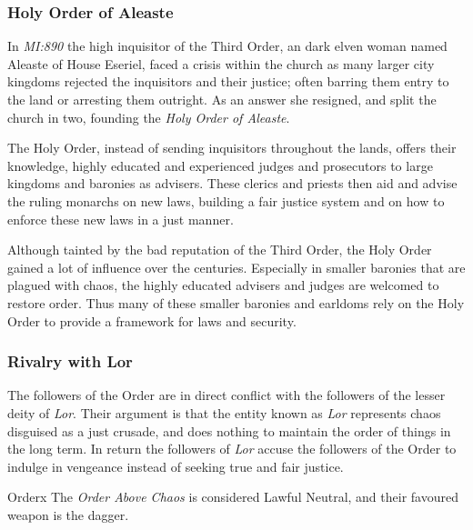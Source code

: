 \subsubsection*{Holy Order of Aleaste}

In \emph{MI:890} the high inquisitor of the Third Order, an dark elven woman
named Aleaste of House Eseriel, faced a crisis within the church as many
larger city kingdoms rejected the inquisitors and their justice; often barring
them entry to the land or arresting them outright. As an answer she resigned,
and split the church in two, founding the \emph{Holy Order of Aleaste}.

The Holy Order, instead of sending inquisitors throughout the lands, offers
their knowledge, highly educated and experienced judges and prosecutors to
large kingdoms and baronies as advisers. These clerics and priests then aid
and advise the ruling monarchs on new laws, building a fair justice system and
on how to enforce these new laws in a just manner.

Although tainted by the bad reputation of the Third Order, the Holy Order
gained a lot of influence over the centuries. Especially in smaller baronies
that are plagued with chaos, the highly educated advisers and judges are
welcomed to restore order. Thus many of these smaller baronies and earldoms
rely on the Holy Order to provide a framework for laws and security.

\subsubsection*{Rivalry with Lor}

The followers of the Order are in direct conflict with the followers of the
lesser deity of \emph{Lor}. Their argument is that the entity known as
\emph{Lor} represents chaos disguised as a just crusade, and does nothing to
maintain the order of things in the long term. In return the followers of
\emph{Lor} accuse the followers of the Order to indulge in vengeance instead
of seeking true and fair justice.

\begin{35e}{Order}x
  The \emph{Order Above Chaos} is considered Lawful Neutral, and their favoured
  weapon is the dagger.
\end{35e}
